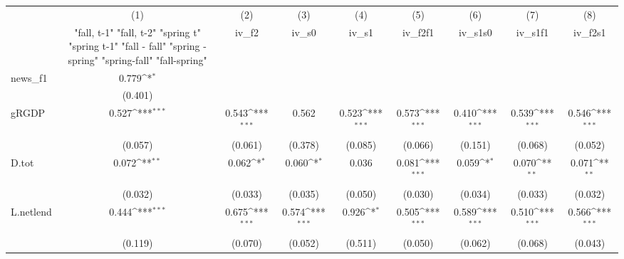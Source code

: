 {
\def\sym#1{\ifmmode^{#1}\else\(^{#1}\)\fi}
\begin{tabular}{l*{8}{c}}
\toprule
            &\multicolumn{1}{c}{(1)}&\multicolumn{1}{c}{(2)}&\multicolumn{1}{c}{(3)}&\multicolumn{1}{c}{(4)}&\multicolumn{1}{c}{(5)}&\multicolumn{1}{c}{(6)}&\multicolumn{1}{c}{(7)}&\multicolumn{1}{c}{(8)}\\
            &\multicolumn{1}{c}{  "fall, t-1" "fall, t-2" "spring t" "spring t-1"  "fall - fall" "spring - spring" "spring-fall" "fall-spring" }&\multicolumn{1}{c}{iv\_f2}&\multicolumn{1}{c}{iv\_s0}&\multicolumn{1}{c}{iv\_s1}&\multicolumn{1}{c}{iv\_f2f1}&\multicolumn{1}{c}{iv\_s1s0}&\multicolumn{1}{c}{iv\_s1f1}&\multicolumn{1}{c}{iv\_f2s1}\\
\midrule
news\_f1     &       0.779\sym{*}  &                     &                     &                     &                     &                     &                     &                     \\
            &     (0.401)         &                     &                     &                     &                     &                     &                     &                     \\
\addlinespace
gRGDP       &       0.527\sym{***}&       0.543\sym{***}&       0.562         &       0.523\sym{***}&       0.573\sym{***}&       0.410\sym{***}&       0.539\sym{***}&       0.546\sym{***}\\
            &     (0.057)         &     (0.061)         &     (0.378)         &     (0.085)         &     (0.066)         &     (0.151)         &     (0.068)         &     (0.052)         \\
\addlinespace
D.tot       &       0.072\sym{**} &       0.062\sym{*}  &       0.060\sym{*}  &       0.036         &       0.081\sym{***}&       0.059\sym{*}  &       0.070\sym{**} &       0.071\sym{**} \\
            &     (0.032)         &     (0.033)         &     (0.035)         &     (0.050)         &     (0.030)         &     (0.034)         &     (0.033)         &     (0.032)         \\
\addlinespace
L.netlend   &       0.444\sym{***}&       0.675\sym{***}&       0.574\sym{***}&       0.926\sym{*}  &       0.505\sym{***}&       0.589\sym{***}&       0.510\sym{***}&       0.566\sym{***}\\
            &     (0.119)         &     (0.070)         &     (0.052)         &     (0.511)         &     (0.050)         &     (0.062)         &     (0.068)         &     (0.043)         \\

\end{tabular}}
